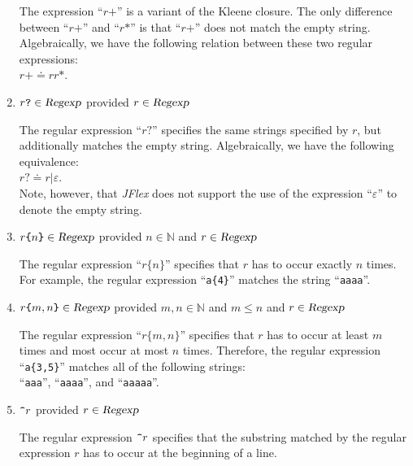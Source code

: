 \begin{enumerate}
      The expression ``$r\texttt{+}$'' is a variant of the Kleene closure.  The only difference
      between  ``$r\texttt{+}$'' and  ``$r\texttt{*}$'' is that  ``$r\texttt{+}$'' does not match
      the empty string.  Algebraically, we have the following relation between these two regular expressions:
      \\[0.2cm]
      \hspace*{1.3cm}
      $r\texttt{+} \doteq rr\mathtt{*}$.
\item $r\texttt{?} \in \textsl{Regexp}$ \quad provided $r \in \textsl{Regexp}$

      The regular expression  ``$r\texttt{?}$'' specifies the same strings specified by $r$, but
      additionally matches the empty string.  Algebraically, we have the following equivalence:
      \\[0.2cm]
      \hspace*{1.3cm}
      $r\texttt{?} \doteq r|\varepsilon$.
      \\[0.2cm]
      Note, however, that \textsl{JFlex} does not support the use of the expression  ``$\varepsilon$'' 
      to denote the empty string.
\item $r\texttt{\{}n\texttt{\}} \in \textsl{Regexp}$ \quad provided $n \in \mathbb{N}$ and $r \in \textsl{Regexp}$

      The regular expression  ``$r\texttt{\{}n\texttt{\}}$'' specifies that $r$ has to occur exactly
      $n$ times.  For example, the regular expression ``\texttt{a\{4\}}'' matches the string
      ``\texttt{aaaa}''. 
\item $r\texttt{\{}m,n \texttt{\}} \in \textsl{Regexp}$ \quad provided $m,n \in \mathbb{N}$ and $m \leq n$ and $r \in \textsl{Regexp}$

      The regular expression  ``$r\texttt{\{}m,n\texttt{\}}$'' specifies that  $r$ has to occur at
      least $m$ times and most occur at most  $n$ times.
      Therefore, the regular expression  ``\texttt{a\{3,5\}}'' matches all of the following strings:
      \\[0.2cm]
      \hspace*{1.3cm}
      ``\texttt{aaa}'', ``\texttt{aaaa}'', and ``\texttt{aaaaa}''.
\item $\texttt{\symbol{94}}r$ \quad provided $r \in \textsl{Regexp}$

      The regular expression  $\texttt{\symbol{94}}r$ specifies that the substring matched by the
      regular expression  $r$ has to occur at the beginning of a line.


\end{enumerate}
